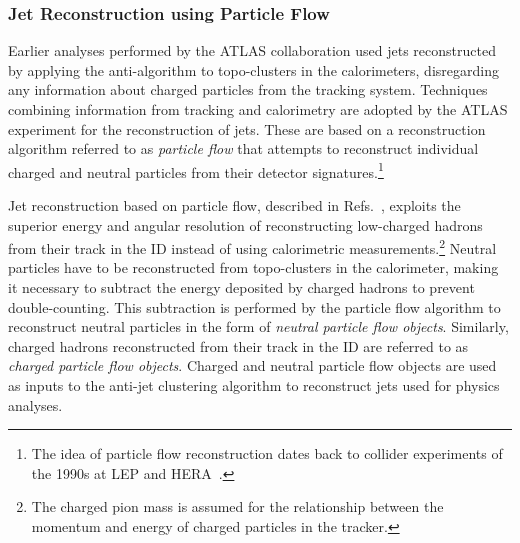 \subsubsection{Jet Reconstruction using Particle Flow}


Earlier analyses performed by the ATLAS collaboration used jets reconstructed by
applying the anti-\kt algorithm to topo-clusters in the calorimeters,
disregarding any information about charged particles from the tracking
system. Techniques combining information from tracking and calorimetry are
adopted by the ATLAS experiment for the reconstruction of jets. These are based
on a reconstruction algorithm referred to as \emph{particle flow} that attempts
to reconstruct individual charged and neutral particles from their detector
signatures.\footnote{The idea of particle flow reconstruction dates back to
  collider experiments of the 1990s at LEP and HERA~\cite{PERF-2015-09}.}

Jet reconstruction based on particle flow, described in
Refs.~\cite{PERF-2015-09,JETM-2018-05}, exploits the superior energy and angular
resolution of reconstructing low-\pT charged hadrons from their track in the ID
instead of using calorimetric measurements.\footnote{The charged pion mass is
  assumed for the relationship between the momentum and energy of charged
  particles in the tracker.} Neutral particles have to be reconstructed from
topo-clusters in the calorimeter, making it necessary to subtract the energy
deposited by charged hadrons to prevent double-counting. This subtraction is
performed by the particle flow algorithm to reconstruct neutral particles in the
form of \emph{neutral particle flow objects}. Similarly, charged hadrons
reconstructed from their track in the ID are referred to as \emph{charged
  particle flow objects}.  Charged and neutral particle flow objects are used as
inputs to the anti-\kt jet clustering algorithm to reconstruct jets used for
physics analyses.

